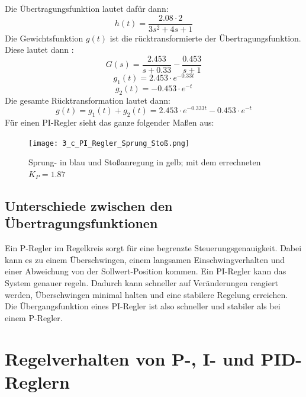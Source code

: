 \documentclass{article}
\begin{document}
\newpage
			Die Übertragungsfunktion lautet dafür dann:
			$$h(t) = \frac{2.08 \cdot 2}{3s^2 + 4s + 1}$$
			Die Gewichtsfunktion $g(t)$ ist die rücktransformierte der Übertragungsfunktion. \\
			Diese lautet dann :
			$$G(s) = \frac{2.453}{s+0.33} - \frac{0.453}{s+1}$$
\vspace{2mm}	
			$$g_1(t) = 2.453 \cdot e^{-0.33t}$$
\vspace{0mm}
			$$g_2(t) = -0.453 \cdot e^{-t}$$
\vspace{1mm}
			Die gesamte Rücktransformation lautet dann:
			$$g(t) = g_1(t) + g_2(t) = 2.453 \cdot e^{-0.333t} - 0.453 \cdot e^{-t}$$
\vspace{3mm}
			Für einen PI-Regler sieht das ganze folgender Maßen aus:
			\begin{figure}[h]
				\texttt{[image: 3\_c\_PI\_Regler\_Sprung\_Stoß.png]}
				\caption{Sprung- in blau und Stoßanregung in gelb; mit dem errechneten $K_P = 1.87$}
				\label{fig32: Sprung. und Stoßantwort}
			\end{figure}	
			
		\subsection{Unterschiede zwischen den Übertragungsfunktionen}
		Ein P-Regler im Regelkreis sorgt für eine begrenzte Steuerungsgenauigkeit. Dabei kann es zu einem Überschwingen, einem langsamen Einschwingverhalten und einer Abweichung von der Sollwert-Position kommen.
		Ein PI-Regler kann das System genauer regeln. Dadurch kann schneller auf Veränderungen reagiert werden, Überschwingen minimal halten und eine stabilere Regelung erreichen.\\
		Die Übergangsfunktion eines PI-Regler ist also schneller und stabiler als bei einem P-Regler.
\newpage
	\section{Regelverhalten von P-, I- und PID-Reglern}
\end{document}
